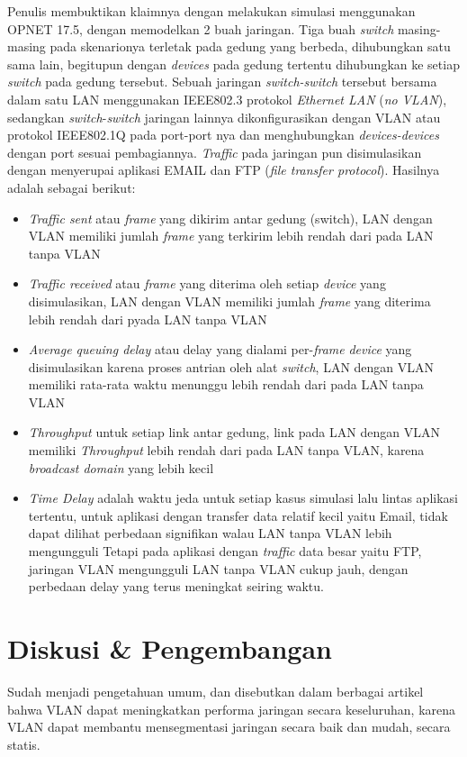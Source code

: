 \documentclass{article}
\begin{document}
Penulis membuktikan klaimnya dengan melakukan simulasi menggunakan OPNET 17.5, dengan memodelkan 2 buah jaringan. 
Tiga buah \emph{switch} masing-masing pada skenarionya terletak pada gedung yang berbeda, 
dihubungkan satu sama lain, begitupun dengan \emph{devices} pada gedung tertentu dihubungkan ke setiap \emph{switch} pada gedung tersebut.
Sebuah jaringan \emph{switch-switch} tersebut bersama dalam satu LAN menggunakan IEEE802.3 protokol \emph{Ethernet LAN} (\emph{no VLAN}), 
sedangkan \emph{switch}-\emph{switch} jaringan lainnya dikonfigurasikan dengan VLAN atau protokol IEEE802.1Q pada port-port nya dan menghubungkan \emph{devices-devices} dengan port sesuai pembagiannya. \emph{Traffic} pada jaringan pun 
disimulasikan dengan menyerupai aplikasi EMAIL dan FTP (\emph{file transfer protocol}). Hasilnya adalah sebagai berikut:

\begin{itemize}
    \item \emph{Traffic sent} atau \emph{frame} yang dikirim antar gedung (switch), LAN dengan VLAN memiliki jumlah 
    \emph{frame} yang terkirim lebih rendah dari pada LAN tanpa VLAN
    \item  \emph{Traffic received} atau \emph{frame} yang diterima oleh setiap \emph{device} yang disimulasikan,  LAN dengan VLAN memiliki jumlah 
    \emph{frame} yang diterima lebih rendah dari pyada LAN tanpa VLAN
    \item  \emph{Average queuing delay} atau delay yang dialami per-\emph{frame}  \emph{device} 
    yang disimulasikan karena proses antrian oleh alat \emph{switch}, 
    LAN dengan VLAN memiliki rata-rata waktu menunggu lebih rendah dari pada LAN tanpa VLAN
    \item \emph{Throughput} untuk setiap link antar gedung, link pada LAN dengan VLAN memiliki \emph{Throughput} lebih rendah dari pada LAN tanpa VLAN, karena \emph{broadcast domain} yang lebih kecil
    \item \emph{Time Delay} adalah waktu jeda untuk setiap kasus simulasi lalu lintas aplikasi tertentu, 
    untuk aplikasi dengan transfer data relatif kecil yaitu Email, tidak dapat dilihat perbedaan signifikan walau LAN tanpa VLAN lebih mengungguli Tetapi pada aplikasi dengan \emph{traffic} data besar yaitu FTP, jaringan VLAN mengungguli LAN tanpa VLAN cukup jauh, dengan perbedaan delay yang terus meningkat seiring waktu. 
\end{itemize}

\section*{Diskusi \& Pengembangan}
Sudah menjadi pengetahuan umum, dan disebutkan dalam berbagai artikel 
bahwa VLAN dapat meningkatkan performa jaringan secara keseluruhan, 
karena VLAN dapat membantu mensegmentasi jaringan 
secara baik dan mudah, secara statis.
\end{document}
